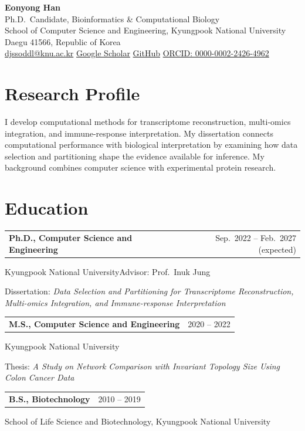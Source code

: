 \documentclass[11pt,a4paper]{article}
\makeatletter
\newcommand{\entry}[2]{\begin{tabularx}{\linewidth}{@{}>{\raggedright\arraybackslash}X r@{}}\textbf{#1}&\small\color{accent}#2\end{tabularx}\par}
\makeatother
\begin{document}
\begin{center}
  {\Huge\bfseries\color{accent}Eonyong Han}\\[5pt]
  {\large Ph.D.\ Candidate, Bioinformatics \& Computational Biology}\\[3pt]
  School of Computer Science and Engineering, Kyungpook National University\\
  Daegu 41566, Republic of Korea\\[5pt]
  \href{mailto:djssoddl@knu.ac.kr}{djssoddl@knu.ac.kr}\quad\textbullet\quad
  \href{https://scholar.google.com/citations?user=NMRL9agAAAAJ}{Google Scholar}\quad\textbullet\quad
  \href{https://github.com/EONYONG-HAN}{GitHub}\quad\textbullet\quad
  \href{https://orcid.org/0000-0002-2426-4962}{ORCID: 0000-0002-2426-4962}
\end{center}

\section{Research Profile}
I develop computational methods for transcriptome reconstruction, multi-omics integration,
and immune-response interpretation. My dissertation connects computational performance
with biological interpretation by examining how data selection and partitioning shape
the evidence available for inference. My background combines computer science with
experimental protein research.

\section{Education}
\entry{Ph.D., Computer Science and Engineering}{Sep.\ 2022 -- Feb.\ 2027 (expected)}
Kyungpook National University\enspace\textbullet\enspace Advisor: Prof.\ Inuk Jung\par
Dissertation: \emph{Data Selection and Partitioning for Transcriptome Reconstruction,
Multi-omics Integration, and Immune-response Interpretation}
\vspace{4pt}

\entry{M.S., Computer Science and Engineering}{2020 -- 2022}
Kyungpook National University\par
Thesis: \emph{A Study on Network Comparison with Invariant Topology Size Using Colon Cancer Data}
\vspace{4pt}

\entry{B.S., Biotechnology}{2010 -- 2019}
School of Life Science and Biotechnology, Kyungpook National University
\end{document}
